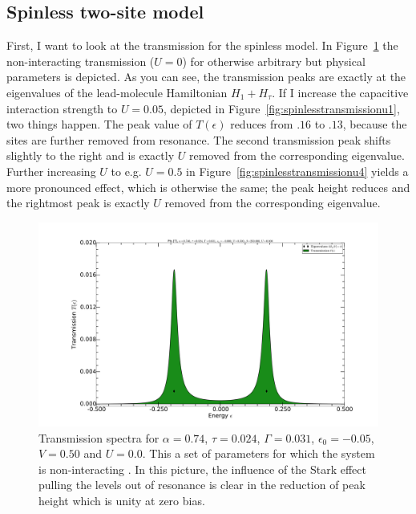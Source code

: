 \subsection{Spinless two-site model}
First, I want to look at the transmission for the spinless model. In Figure~\ref{fig:spinlesstransmissionu0} the non\hyp{}interacting transmission ($U=0$) for otherwise arbitrary but physical parameters is depicted. As you can see, the transmission peaks are exactly at the eigenvalues of the lead-molecule Hamiltonian $H_1 + H_\tau$. If I increase the capacitive interaction strength to $U=0.05$, depicted in Figure~\ref{fig:spinlesstransmissionu1}, two things happen. The peak value of $T(\epsilon)$ reduces from $.16$ to $.13$, because the sites are further removed from resonance. The second transmission peak shifts slightly to the right and is exactly $U$ removed from the corresponding eigenvalue. Further increasing $U$ to e.g. $U=0.5$ in Figure~\ref{fig:spinlesstransmissionu4} yields a more pronounced effect, which is otherwise the same; the peak height reduces and the rightmost peak is exactly $U$ removed from the corresponding eigenvalue.
\begin{figure}[h]
    \centering
    \includegraphics[height=.35\textheight,clip=true,trim=7cm 2cm 7cm 4cm]{pdf/trans/decospinlesstransmissionarbitraryu0.pdf}
    \caption{Transmission spectra for $\alpha=0.74$, $\tau=0.024$, $\Gamma=0.031$, $\epsilon_0 = - 0.05$, $V=0.50$ and $U=0.0$. This a set of parameters for which the system is non\hyp{}interacting . In this picture, the influence of the Stark effect pulling the levels out of resonance is clear in the reduction of peak height which is unity at zero bias.}
    \label{fig:spinlesstransmissionu0}
\end{figure}
